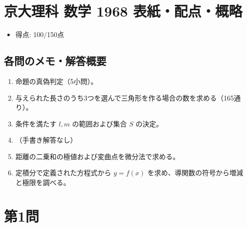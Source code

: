 \documentclass[../main.tex]{subfiles}
\begin{document}
\section*{京大理科 数学 1968 表紙・配点・概略}

\begin{itemize}
  \item 得点: 100/150点
\end{itemize}

\subsection*{各問のメモ・解答概要}
\begin{enumerate}
  \item 命題の真偽判定（5小問）。
  \item 与えられた長さのうち3つを選んで三角形を作る場合の数を求める（165通り）。
  \item 条件を満たす $l, m$ の範囲および集合 $S$ の決定。
  \item （手書き解答なし）
  \item 距離の二乗和の極値および変曲点を微分法で求める。
  \item 定積分で定義された方程式から $y=f(x)$ を求め、導関数の符号から増減と極限を調べる。
\end{enumerate}

\newpage

\section*{第1問}
\end{document}
